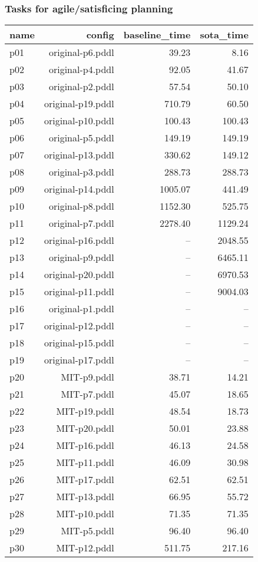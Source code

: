 \documentclass{article}
\begin{document}
                    \subsubsection*{Tasks for agile/satisficing planning}
                    
                            \begin{center}
                            \scriptsize
                            \begin{tabular}{@{}l|r|r|r@{}}
                            name & config & baseline\_time & sota\_time\\\midrule
                              p01& original-p6.pddl&39.23&8.16\\
  p02& original-p4.pddl&92.05&41.67\\
  p03& original-p2.pddl&57.54&50.10\\
  p04& original-p19.pddl&710.79&60.50\\
  p05& original-p10.pddl&100.43&100.43\\
  p06& original-p5.pddl&149.19&149.19\\
  p07& original-p13.pddl&330.62&149.12\\
  p08& original-p3.pddl&288.73&288.73\\
  p09& original-p14.pddl&1005.07&441.49\\
  p10& original-p8.pddl&1152.30&525.75\\
  p11& original-p7.pddl&2278.40&1129.24\\
  p12& original-p16.pddl&--&2048.55\\
  p13& original-p9.pddl&--&6465.11\\
  p14& original-p20.pddl&--&6970.53\\
  p15& original-p11.pddl&--&9004.03\\
  p16& original-p1.pddl&--&--\\
  p17& original-p12.pddl&--&--\\
  p18& original-p15.pddl&--&--\\
  p19& original-p17.pddl&--&--\\
  p20& MIT-p9.pddl&38.71&14.21\\
  p21& MIT-p7.pddl&45.07&18.65\\
  p22& MIT-p19.pddl&48.54&18.73\\
  p23& MIT-p20.pddl&50.01&23.88\\
  p24& MIT-p16.pddl&46.13&24.58\\
  p25& MIT-p11.pddl&46.09&30.98\\
  p26& MIT-p17.pddl&62.51&62.51\\
  p27& MIT-p13.pddl&66.95&55.72\\
  p28& MIT-p10.pddl&71.35&71.35\\
  p29& MIT-p5.pddl&96.40&96.40\\
  p30& MIT-p12.pddl&511.75&217.16
                            \end{tabular}
                            \end{center}
                    
\end{document}
